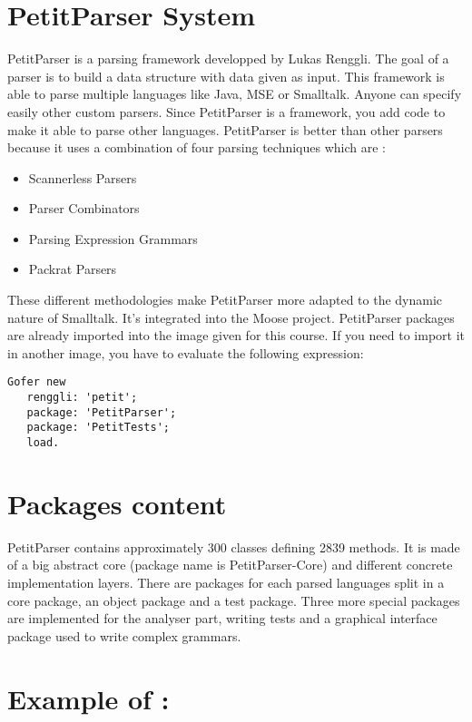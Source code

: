 

\usepackage{lipsum}





\section{PetitParser System}
PetitParser is a parsing framework developped by Lukas Renggli. The goal of a parser is to build a data structure with data given as input. This framework is able to parse multiple languages like Java, MSE or Smalltalk. Anyone can specify easily other custom parsers. Since PetitParser is a framework, you add code to make it able to parse other languages.
PetitParser is better than other parsers because it uses a combination of four parsing techniques which are :
\begin{itemize}
\item Scannerless Parsers
\item Parser Combinators
\item Parsing Expression Grammars
\item Packrat Parsers
\end{itemize}
These different methodologies make PetitParser more adapted to the dynamic nature of Smalltalk.
It's integrated into the Moose project. PetitParser packages are already imported into the image given for this course. If you need to import it in another image, you have to evaluate the following expression: 
\begin{lstlisting}
Gofer new
   renggli: 'petit'; 
   package: 'PetitParser';
   package: 'PetitTests';
   load.
\end{lstlisting}



\section{Packages content}

PetitParser contains approximately 300 classes defining 2839 methods. It is made of a big abstract core (package name is PetitParser-Core) and different concrete implementation layers. There are packages for each parsed languages split in a core package, an object package and a test package. Three more special packages are implemented for the analyser part, writing tests and a graphical interface package used to write complex grammars. 

\section{Example of :}
